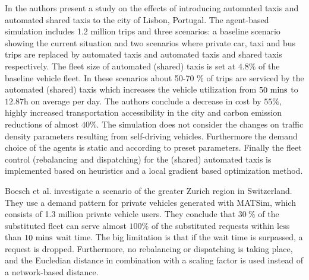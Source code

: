 In \cite{martinez2017assessing} the authors present a study on the effects of
introducing automated taxis and automated shared taxis to the city of Lisbon,
Portugal. The agent-based simulation includes 1.2 million trips and three scenarios:
a baseline scenario showing the current situation and two scenarios where private car,
taxi and bus trips are replaced by automated taxis and automated taxis and shared
taxis respectively. The fleet size of automated (shared) taxis is set at $4.8\%$ of
the baseline vehicle fleet. In these scenarios about 50-70 \% of trips are serviced
by the automated (shared) taxis which increases the vehicle utilization
from $50 ~ \textnormal{mins}$ to $12.87\text{h}$ on average per day. The authors conclude
a decrease in cost by $55 \%$, highly increased transportation
accessibility in the city and carbon emission reductions of almost $40\%$. The
simulation does not consider the changes on traffic density parameters resulting
from self-driving vehicles. Furthermore the demand choice of the agents is static
and according to preset parameters. Finally the fleet control (rebalancing and dispatching)
for the (shared) automated taxis is implemented based on heuristics and a local
gradient based optimization method.

Boesch et al. \cite{boesch2016autonomous} investigate a scenario of the greater
Zurich region in Switzerland. They use a demand pattern for private vehicles
generated with MATSim, which consists of 1.3 million private vehicle users.
They conclude that $30 ~ \%$ of the substituted fleet can serve almost $100 \%$ of the substituted
requests within less than $10 ~ \textnormal{mins}$ wait time. The big limitation
is that if the wait time is surpassed, a request is dropped. Furthermore, no rebalancing
or dispatching is taking place, and the Eucledian distance in combination with a scaling factor is
used instead of a network-based distance. %

